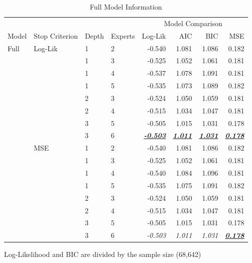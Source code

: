 \documentclass[12pt]{article}
\newcommand{\ti}[1]{\textit{#1}}
\newcommand{\ibu}[1]{\textbf{\underline{\textit{#1}}}}
\newcommand{\T}{\rule{0pt}{2.5ex}}       %
\begin{document}
\begin{table} \centering
  \caption{Full Model Information}
  \begin{threeparttable}
    {\footnotesize
    \begin{tabular}[r]{l l l l r r r r}
  \cmidrule{1-8}
        &            &        &         &  \multicolumn{4}{c}{Model Comparison} \\ 
   \cmidrule(l){5-8}
Model   & Stop Criterion  &  Depth & Experts & Log-Lik & AIC    & BIC    & MSE   \\ 
  \cmidrule{1-8}

Full    &  Log-Lik   &   1    &    2    & -0.540  & 1.081  & 1.086  & 0.182 \\
        &            &   1    &    3    & -0.525  & 1.052  & 1.061  & 0.181 \\
        &            &   1    &    4    & -0.537  & 1.078  & 1.091  & 0.181 \\
        &            &   1    &    5    & -0.535  & 1.073  & 1.089  & 0.182 \\
        &            &   2    &    3    & -0.524  & 1.050  & 1.059  & 0.181 \\
        &            &   2    &    4    & -0.515  & 1.034  & 1.047  & 0.181 \\
        &            &   3    &    5    & -0.505  & 1.015  & 1.031  & 0.178 \\
        &            &   3    &    6    & \ibu{-0.503}  & \ibu{1.011}  & \ibu{1.031}  & \ibu{0.178} \\ \T 
        &  MSE       &   1    &    2    & -0.540  & 1.081  & 1.086  & 0.182 \\
        &            &   1    &    3    & -0.525  & 1.052  & 1.061  & 0.181 \\
        &            &   1    &    4    & -0.540  & 1.084  & 1.096  & 0.181 \\
        &            &   1    &    5    & -0.535  & 1.075  & 1.091  & 0.182 \\
        &            &   2    &    3    & -0.524  & 1.050  & 1.059  & 0.181 \\
        &            &   2    &    4    & -0.515  & 1.034  & 1.047  & 0.181 \\
        &            &   3    &    5    & -0.505  & 1.015  & 1.031  & 0.178 \\
        &            &   3    &    6    & \ti{-0.503}  & \ti{1.011}  & \ti{1.031}  & \ibu{0.178} \\
        \cmidrule(l){1-8}
    \end{tabular}
    }
    \begin{tablenotes}
      \item{\footnotesize Log-Likelihood and BIC are divided by the sample size (68,642)}
    \end{tablenotes} \label{tbl:HME_spec_full}
  \end{threeparttable}
\end{table}
\end{document}
